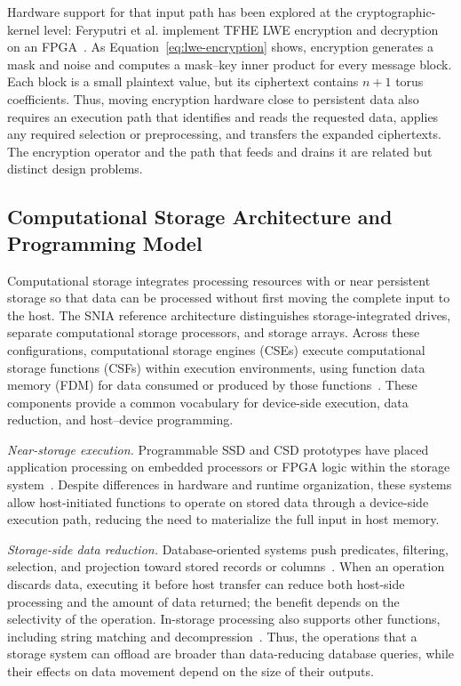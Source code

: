 Hardware support for that input path has been explored at the cryptographic-kernel level: Feryputri et al. implement TFHE LWE encryption and decryption on an FPGA~\cite{feryputri-lwe-fpga}. As Equation~\eqref{eq:lwe-encryption} shows, encryption generates a mask and noise and computes a mask--key inner product for every message block. Each block is a small plaintext value, but its ciphertext contains $n+1$ torus coefficients. Thus, moving encryption hardware close to persistent data also requires an execution path that identifies and reads the requested data, applies any required selection or preprocessing, and transfers the expanded ciphertexts. The encryption operator and the path that feeds and drains it are related but distinct design problems.

\subsection{Computational Storage Architecture and Programming Model}
\label{subsec:csd-background}

Computational storage integrates processing resources with or near persistent storage so that data can be processed without first moving the complete input to the host. The SNIA reference architecture distinguishes storage-integrated drives, separate computational storage processors, and storage arrays. Across these configurations, computational storage engines (CSEs) execute computational storage functions (CSFs) within execution environments, using function data memory (FDM) for data consumed or produced by those functions~\cite{sniacs}. These components provide a common vocabulary for device-side execution, data reduction, and host--device programming.

\emph{Near-storage execution.} Programmable SSD and CSD prototypes have placed application processing on embedded processors or FPGA logic within the storage system~\cite{kang-smartssd,willow,biscuit,insider}. Despite differences in hardware and runtime organization, these systems allow host-initiated functions to operate on stored data through a device-side execution path, reducing the need to materialize the full input in host memory.

\emph{Storage-side data reduction.} Database-oriented systems push predicates, filtering, selection, and projection toward stored records or columns~\cite{do-smartssd,biscuit,skyhook,upp}. When an operation discards data, executing it before host transfer can reduce both host-side processing and the amount of data returned; the benefit depends on the selectivity of the operation. In-storage processing also supports other functions, including string matching and decompression~\cite{insider}. Thus, the operations that a storage system can offload are broader than data-reducing database queries, while their effects on data movement depend on the size of their outputs.

